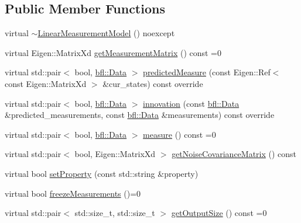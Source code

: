 \subsection*{Public Member Functions}
\begin{DoxyCompactItemize}
\item 
virtual \mbox{\hyperlink{classbfl_1_1LinearMeasurementModel_a63c960a494c8ae6142fb59821dfaab16}{$\sim$\+Linear\+Measurement\+Model}} () noexcept
\item 
virtual Eigen\+::\+Matrix\+Xd \mbox{\hyperlink{classbfl_1_1LinearMeasurementModel_a719734ef024a766f03b86e51dc849953}{get\+Measurement\+Matrix}} () const =0
\item 
virtual std\+::pair$<$ bool, \mbox{\hyperlink{namespacebfl_af6b103c6821db1b54452f776fdd9dd02}{bfl\+::\+Data}} $>$ \mbox{\hyperlink{classbfl_1_1LinearMeasurementModel_a8831b8acb4790db4c69db73200375c69}{predicted\+Measure}} (const Eigen\+::\+Ref$<$ const Eigen\+::\+Matrix\+Xd $>$ \&cur\+\_\+states) const override
\item 
virtual std\+::pair$<$ bool, \mbox{\hyperlink{namespacebfl_af6b103c6821db1b54452f776fdd9dd02}{bfl\+::\+Data}} $>$ \mbox{\hyperlink{classbfl_1_1LinearMeasurementModel_a12485b4b6d511e97e338a4db6861b277}{innovation}} (const \mbox{\hyperlink{namespacebfl_af6b103c6821db1b54452f776fdd9dd02}{bfl\+::\+Data}} \&predicted\+\_\+measurements, const \mbox{\hyperlink{namespacebfl_af6b103c6821db1b54452f776fdd9dd02}{bfl\+::\+Data}} \&measurements) const override
\item 
virtual std\+::pair$<$ bool, \mbox{\hyperlink{namespacebfl_af6b103c6821db1b54452f776fdd9dd02}{bfl\+::\+Data}} $>$ \mbox{\hyperlink{classbfl_1_1MeasurementModel_ad372b720cef4e6bc0ac2489f4098bfc9}{measure}} () const =0
\item 
virtual std\+::pair$<$ bool, Eigen\+::\+Matrix\+Xd $>$ \mbox{\hyperlink{classbfl_1_1MeasurementModel_af25f42076b69e0c6cab47d36d796536f}{get\+Noise\+Covariance\+Matrix}} () const
\item 
virtual bool \mbox{\hyperlink{classbfl_1_1MeasurementModel_af97e18b52d1a3f365dd5982b8cc4aff7}{set\+Property}} (const std\+::string \&property)
\item 
virtual bool \mbox{\hyperlink{classbfl_1_1MeasurementModel_a67ef096c5b3682252582aec75498089d}{freeze\+Measurements}} ()=0
\item 
virtual std\+::pair$<$ std\+::size\+\_\+t, std\+::size\+\_\+t $>$ \mbox{\hyperlink{classbfl_1_1MeasurementModel_a6cca2022b576c9dbb61e73b83a10c6ee}{get\+Output\+Size}} () const =0
\item 

\end{DoxyCompactItemize}
